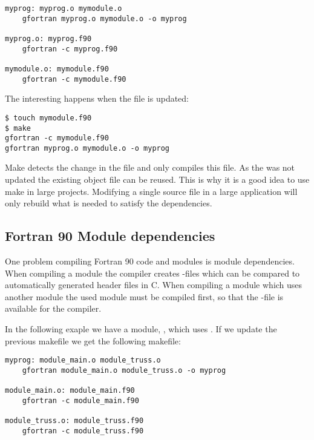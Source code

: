 \mmode

\begin{lstlisting}
myprog: myprog.o mymodule.o
	gfortran myprog.o mymodule.o -o myprog

myprog.o: myprog.f90 
	gfortran -c myprog.f90

mymodule.o: mymodule.f90
	gfortran -c mymodule.f90
\end{lstlisting}

The interesting happens when the  file is updated:

\cmdmode

\begin{lstlisting}
$ touch mymodule.f90 
$ make
gfortran -c mymodule.f90
gfortran myprog.o mymodule.o -o myprog
\end{lstlisting}

Make detects the change in the  file and only compiles this file. As the  was not updated the existing object file can be reused. This is why it is a good idea to use make in large projects. Modifying a single source file in a large application will only rebuild what is needed to satisfy the dependencies.

\subsection{Fortran 90 Module dependencies}

One problem compiling Fortran 90 code and modules is module dependencies. When compiling a module the compiler creates -files which can be compared to automatically generated header files in C. When compiling a module which uses another module the used module must be compiled first, so that the -file is available for the compiler. 

In the following exaple we have a module, , which uses . If we update the previous makefile we get the following makefile:

\mmode

\begin{lstlisting}
myprog: module_main.o module_truss.o
	gfortran module_main.o module_truss.o -o myprog

module_main.o: module_main.f90
	gfortran -c module_main.f90

module_truss.o: module_truss.f90
	gfortran -c module_truss.f90
\end{lstlisting}

